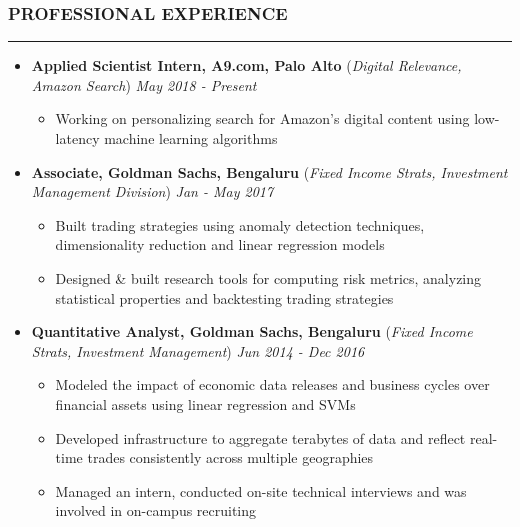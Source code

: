 \documentclass[10pt,a4paper,English]{article}
\newcommand\roottitle[1]{\vspace{-4mm}\subsubsection*{\uppercase{#1}}\vspace{-0.3em}\nopagebreak[4]\hrule\vspace{4mm}}
\newcommand\itemyear[1]{\hfill \emph{\color{itemyear} #1}}
\newcommand\itemenv{\setlength\itemsep{0.5pt} \addtolength{\itemindent}{-5mm}\vspace{-1.5mm}}
\begin{document}
\roottitle{Professional Experience}
\begin{itemize} \itemenv

    \item \textbf{Applied Scientist Intern, A9.com, Palo Alto} \hfill({\emph{Digital Relevance, Amazon Search}}) \itemyear{May 2018 - Present}
        \begin{itemize} \itemenv
            \item Working on personalizing search for Amazon's digital content using low-latency machine learning algorithms
        \end{itemize}

    \item \textbf{Associate, Goldman Sachs, Bengaluru} \hfill (\emph{Fixed Income Strats, Investment Management Division}) \itemyear{Jan - May 2017}
        \begin{itemize} \itemenv
            \item Built trading strategies using anomaly detection techniques, dimensionality reduction and linear regression models
            \item Designed \& built research tools for computing risk metrics, analyzing statistical properties and backtesting trading strategies
        \end{itemize}

    \item \textbf{Quantitative Analyst, Goldman Sachs, Bengaluru} \hfill (\emph{Fixed Income Strats, Investment Management}) \itemyear{Jun 2014 - Dec 2016}
        \begin{itemize} \itemenv
            \item Modeled the impact of economic data releases and business cycles over financial assets using linear regression and SVMs
            \item Developed infrastructure to aggregate terabytes of data and reflect real-time trades consistently across multiple geographies
            \item Managed an intern, conducted on-site technical interviews and was involved in on-campus recruiting
        \end{itemize}


\end{itemize}
\end{document}
